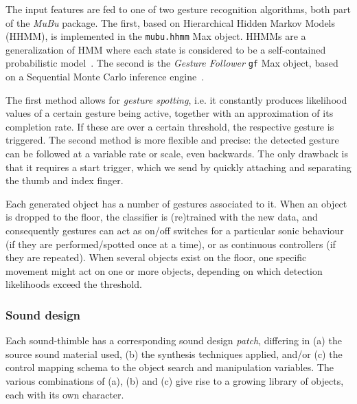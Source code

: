 \documentclass{nime-alternate}
\begin{document}
The input features are fed to one of two gesture recognition algorithms, both part of the \textit{MuBu} package. The first, based on Hierarchical Hidden Markov Models (HHMM), is implemented in the \texttt{mubu.hhmm} Max object. HHMMs are a generalization of HMM where each state is considered to be a self-contained probabilistic model~\cite{probabilisticmodels,hhmm}. The second is the \textit{Gesture Follower} \texttt{gf} Max object, based on a Sequential Monte Carlo inference engine~\cite{caramiaux2015adaptive}. 

The first method allows for \textit{gesture spotting}, i.e. it constantly produces likelihood values of a certain gesture being active, together with an approximation of its completion rate. If these are over a certain threshold, the respective gesture is triggered. The second method is more flexible and precise: the detected gesture can be followed at a variable rate or scale, even backwards. The only drawback is that it requires a start trigger, which we send by quickly attaching and separating the thumb and index finger.

Each generated object has a number of gestures associated to it. When an object is dropped to the floor, the classifier is (re)trained with the new data, and consequently gestures can act as on/off switches for a particular sonic behaviour (if they are performed/spotted once at a time), or as continuous controllers (if they are repeated). When several objects exist on the floor, one specific movement might act on one or more objects, depending on which detection likelihoods exceed the threshold. 


\subsubsection{Sound design}

Each sound-thimble has a corresponding sound design \textit{patch}, differing in (a) the source sound material used, (b) the synthesis techniques applied, and/or (c) the control mapping schema to the object search and manipulation variables. The various combinations of (a), (b) and (c) give rise to a growing library of objects, each with its own character.
\end{document}
